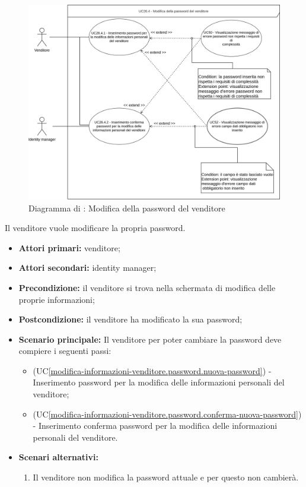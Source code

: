 \begin{figure}[H]
    \centering
    \includegraphics[scale=0.6]{Immagini/DiagrammiUC/Venditore/ModificaPasswordVenditore.png}
    \caption{Diagramma di \actualSubUC: Modifica della password del venditore}
    \label{fig:modifica-informazioni-venditore.password}
\end{figure}

Il venditore vuole modificare la propria password.
\begin{itemize}
    \item \textbf{Attori primari:} venditore;
	\item \textbf{Attori secondari:} identity manager;
    \item \textbf{Precondizione:} il venditore si trova nella schermata di modifica delle proprie informazioni;
    \item \textbf{Postcondizione:} il venditore ha modificato la sua password;
    \item \textbf{Scenario principale:} Il venditore per poter cambiare la password deve compiere i seguenti passi:
        \begin{itemize}
            \item (UC\ref{modifica-informazioni-venditore.password.nuova-password}) - Inserimento password per la modifica delle informazioni personali del venditore;
            \item (UC\ref{modifica-informazioni-venditore.password.conferma-nuova-password}) - Inserimento conferma password per la modifica delle informazioni personali del venditore.
        \end{itemize}
    \item \textbf{Scenari alternativi:}
    \begin{enumerate}[label=\lett]
    	\item Il venditore non modifica la password attuale e per questo non cambierà.
    \end{enumerate}
\end{itemize}

